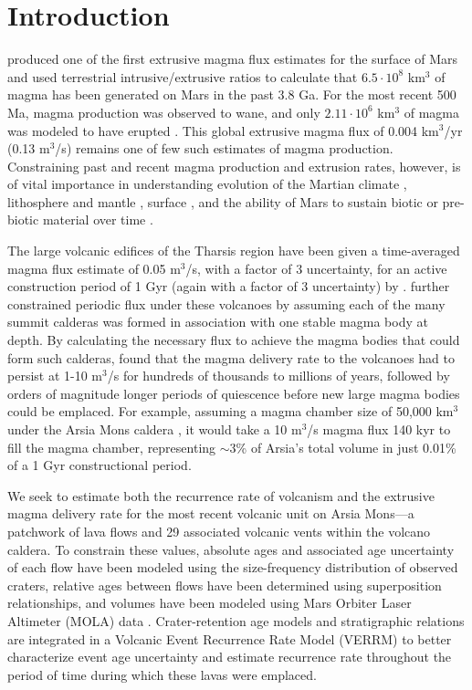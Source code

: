 \section{Introduction}

\citet{greeley1991magma} produced one of the first extrusive magma flux estimates for the surface of Mars and used terrestrial intrusive/extrusive ratios to calculate that $6.5\cdot 10^8$ km$^3$ of magma has been generated on Mars in the past 3.8 Ga. For the most recent 500 Ma, magma production was observed to wane, and only $2.11\cdot 10^6$ km$^3$ of magma was modeled to have erupted \citep{greeley1991magma}. This global extrusive magma flux of 0.004 km$^3$/yr (0.13 m$^3$/s) remains one of few such estimates of magma production. Constraining past and recent magma production and extrusion rates, however, is of vital importance in understanding evolution of the Martian climate \citep[e.g.]{mouginis2008lava,halevy2014episodic}, lithosphere and mantle \citep{grott2013long}, surface \citep{wilson1994mars}, and the ability of Mars to sustain biotic or pre-biotic material over time \citep{scanlon2015volcanism}.

The large volcanic edifices of the Tharsis region have been given a time-averaged magma flux estimate of 0.05 m$^3$/s, with a factor of 3 uncertainty, for an active construction period of 1 Gyr (again with a factor of 3 uncertainty) by \citet{wilson2001evidence}. \citet{wilson2001evidence} further constrained periodic flux under these volcanoes by assuming each of the many summit calderas was formed in association with one stable magma body at depth. By calculating the necessary flux to achieve the magma bodies that could form such calderas, \citet{wilson2001evidence} found that the magma delivery rate to the volcanoes had to persist at 1-10 m$^3$/s for hundreds of thousands to millions of years, followed by orders of magnitude longer periods of quiescence before new large magma bodies could be emplaced. For example, assuming a magma chamber size of 50,000 km$^3$ under the Arsia Mons caldera \citep{wilson2001evidence}, it would take a 10 m$^3$/s magma flux 140 kyr to fill the magma chamber, representing $\sim$3\% of Arsia's total volume in just 0.01\% of a 1 Gyr constructional period.

We seek to estimate both the recurrence rate of volcanism and the extrusive magma delivery rate for the most recent volcanic unit on Arsia Mons---a patchwork of lava flows and 29 associated volcanic vents within the volcano caldera. To constrain these values, absolute ages and associated age uncertainty of each flow have been modeled using the size-frequency distribution of observed craters, relative ages between flows have been determined using superposition relationships, and volumes have been modeled using Mars Orbiter Laser Altimeter (MOLA) data \citep{smith2003mars}. Crater-retention age models and stratigraphic relations are integrated in a Volcanic Event Recurrence Rate Model (VERRM) to better characterize event age uncertainty and estimate recurrence rate throughout the period of time during which these lavas were emplaced.

